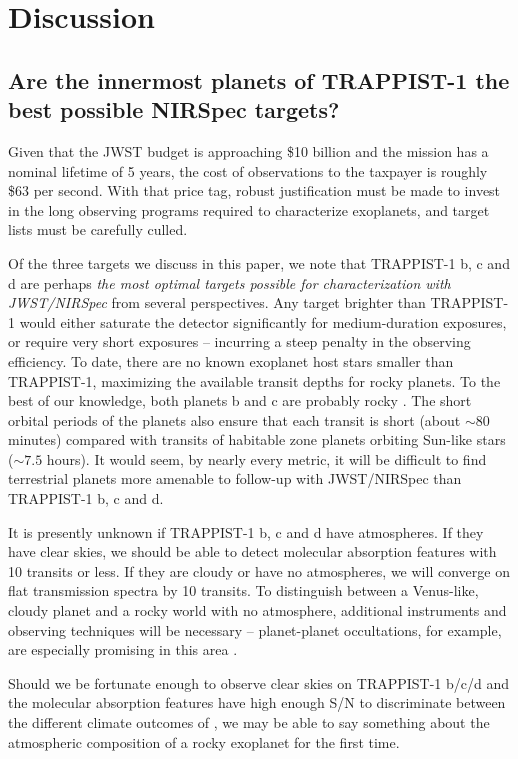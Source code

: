 \section{Discussion}

\subsection{Are the innermost planets of TRAPPIST-1 the best possible NIRSpec targets?}

Given that the JWST budget is approaching \$10 billion and the mission has a nominal lifetime of 5 years, the cost of observations to the taxpayer is roughly \$63 per second. With that price tag, robust justification must be made to invest in the long observing programs required to characterize exoplanets, and target lists must be carefully culled. 

Of the three targets we discuss in this paper, we note that TRAPPIST-1 b, c and d are perhaps \textit{the most optimal targets possible for characterization with JWST/NIRSpec} from several perspectives. Any target brighter than TRAPPIST-1 would either saturate the detector significantly for medium-duration exposures, or require very short exposures -- incurring a steep penalty in the observing efficiency. To date, there are no known exoplanet host stars smaller than TRAPPIST-1, maximizing the available transit depths for rocky planets. To the best of our knowledge, both planets b and c are probably rocky \citep{Weiss2014,Marcy2014,Rogers2015,Fulton2017}. The short orbital periods of the planets also ensure that each transit is short (about $\sim 80$ minutes) compared with transits of habitable zone planets orbiting Sun-like stars ($\sim 7.5$ hours). It would seem, by nearly every metric, it will be difficult to find terrestrial planets more amenable to follow-up with JWST/NIRSpec than TRAPPIST-1 b, c and d. 

It is presently unknown if TRAPPIST-1 b, c and d have atmospheres. If they have clear skies, we should be able to detect molecular absorption features with 10 transits or less. If they are cloudy or have no atmospheres, we will converge on flat transmission spectra by 10 transits. To distinguish between a Venus-like, cloudy planet and a rocky world with no atmosphere, additional instruments and observing techniques will be necessary -- planet-planet occultations, for example, are especially promising in this area \citep{Luger2017b}. 

Should we be fortunate enough to observe clear skies on TRAPPIST-1 b/c/d and the molecular absorption features have high enough S/N to discriminate between the different climate outcomes of \citet{Lincowski2018}, we may be able to say something about the atmospheric composition of a rocky exoplanet for the first time.

